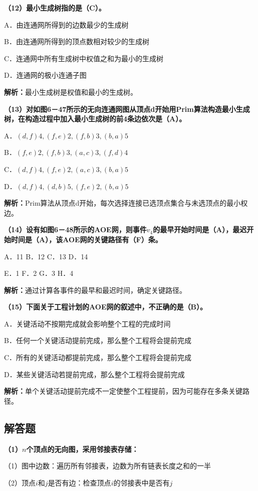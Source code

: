 \documentclass[12pt,a4paper]{amsart}
\begin{document}
\textbf{（12）最小生成树指的是（C）。}

A．由连通网所得到的边数最少的生成树

B．由连通网所得到的顶点数相对较少的生成树

C．连通网中所有生成树中权值之和为最小的生成树

D．连通网的极小连通子图

\textbf{解析：}最小生成树是权值和最小的生成树。

\textbf{（13）对如图6－47所示的无向连通网图从顶点d开始用Prim算法构造最小生成树，在构造过程中加入最小生成树的前4条边依次是（A）。}

A．$(d,f)4,(f,e)2,(f,b)3,(b,a)5$

B．$(f,e)2,(f,b)3,(a,c)3,(f,d)4$

C．$(d,f)4,(f,e)2,(a,c)3,(b,a)5$

D．$(d,f)4,(d,b)5,(f,e)2,(b,a)5$

\textbf{解析：}Prim算法从顶点d开始，每次选择连接已选顶点集合与未选顶点的最小权边。

\textbf{（14）设有如图6－48所示的AOE网，则事件$v_4$的最早开始时间是（A），最迟开始时间是（A），该AOE网的关键路径有（F）条。}

A．11 \quad B．12 \quad C．13 \quad D．14

E．1 \quad F．2 \quad G．3 \quad H．4

\textbf{解析：}通过计算各事件的最早和最迟时间，确定关键路径。

\textbf{（15）下面关于工程计划的AOE网的叙述中，不正确的是（B）。}

A．关键活动不按期完成就会影响整个工程的完成时间

B．任何一个关键活动提前完成，那么整个工程将会提前完成

C．所有的关键活动都提前完成，那么整个工程将会提前完成

D．某些关键活动若提前完成，那么整个工程将会提前完成

\textbf{解析：}单个关键活动提前完成不一定使整个工程提前，因为可能存在多条关键路径。

\subsection{解答题}

\textbf{（1）$n$个顶点的无向图，采用邻接表存储：}

（1）图中边数：遍历所有邻接表，边数为所有链表长度之和的一半

（2）顶点$i$和$j$是否有边：检查顶点$i$的邻接表中是否有$j$
\end{document}
